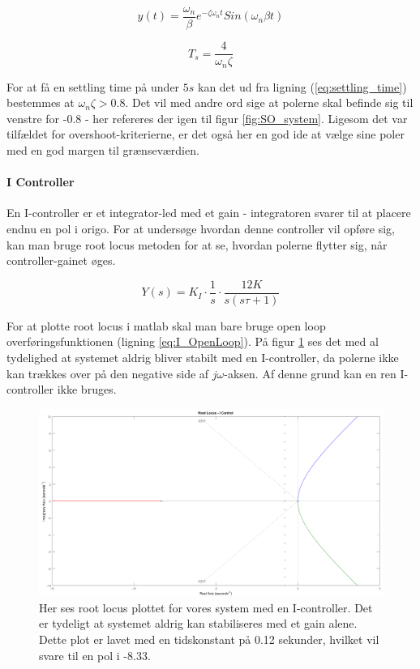 \begin{equation}\label{eq:impulse_response}
y(t)=\frac{\omega_{n}}{\beta}e^{-\zeta\omega_{n}t}Sin(\omega_{n}\beta t)
\end{equation}

\begin{equation}\label{eq:settling_time}
T_{s}=\frac{4}{\omega_{n}\zeta}
\end{equation}

For at få en settling time på under $5s$ kan det ud fra ligning (\ref{eq:settling_time}) bestemmes at $\omega_{n}\zeta > 0.8$. Det vil med andre ord sige at polerne skal befinde sig til venstre for -0.8 - her refereres der igen til figur \ref{fig:SO_system}. Ligesom det var tilfældet for overshoot-kriterierne, er det også her en god ide at vælge sine poler med en god margen til grænseværdien.

\paragraph{I Controller}

En I-controller er et integrator-led med et gain - integratoren svarer til at placere endnu en pol i origo. For at undersøge hvordan denne controller vil opføre sig, kan man bruge root locus metoden for at se, hvordan polerne flytter sig, når controller-gainet øges. 

\begin{equation}\label{eq:I_OpenLoop}
Y(s)=K_{I}\cdot\frac{1}{s}\cdot\frac{12K}{s(s\tau+1)}
\end{equation}

For at plotte root locus i matlab skal man bare bruge open loop overføringsfunktionen (ligning \ref{eq:I_OpenLoop}). På figur \ref{fig:I_rlocus} ses det med al tydelighed at systemet aldrig bliver stabilt med en I-controller, da polerne ikke kan trækkes over på den negative side af $j\omega$-aksen. Af denne grund kan en ren I-controller ikke bruges.

\begin{figure}[ht]
	\begin{center}
		\includegraphics[scale=0.35]{Billeder/I_rlocus.PNG}
	\end{center}
\caption{Her ses root locus plottet for vores system med en I-controller. Det er tydeligt at systemet aldrig kan stabiliseres med et gain alene. Dette plot er lavet med en tidskonstant på 0.12 sekunder, hvilket vil svare til en pol i -8.33.}
\label{fig:I_rlocus}
\end{figure}

